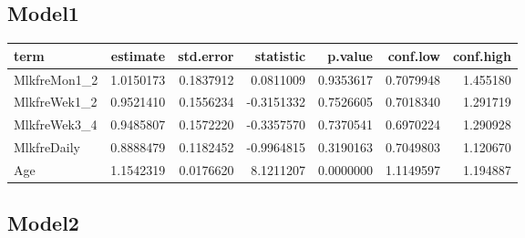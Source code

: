 \documentclass[
]{article}
\newenvironment{Shaded}{\begin{snugshade}}{\end{snugshade}}
\newcommand{\DataTypeTok}[1]{\textcolor[rgb]{0.13,0.29,0.53}{#1}}
\newcommand{\KeywordTok}[1]{\textcolor[rgb]{0.13,0.29,0.53}{\textbf{#1}}}
\newcommand{\NormalTok}[1]{#1}
\newcommand{\OperatorTok}[1]{\textcolor[rgb]{0.81,0.36,0.00}{\textbf{#1}}}
\newcommand{\OtherTok}[1]{\textcolor[rgb]{0.56,0.35,0.01}{#1}}
\newcommand{\StringTok}[1]{\textcolor[rgb]{0.31,0.60,0.02}{#1}}
\begin{document}
\hypertarget{model1-9}{%
\subsection{Model1}\label{model1-9}}

\begin{Shaded}
\end{Shaded}

\begin{longtable}[]{@{}lrrrrrr@{}}
\toprule
term & estimate & std.error & statistic & p.value & conf.low &
conf.high\tabularnewline
\midrule
\endhead
MlkfreMon1\_2 & 1.0150173 & 0.1837912 & 0.0811009 & 0.9353617 &
0.7079948 & 1.455180\tabularnewline
MlkfreWek1\_2 & 0.9521410 & 0.1556234 & -0.3151332 & 0.7526605 &
0.7018340 & 1.291719\tabularnewline
MlkfreWek3\_4 & 0.9485807 & 0.1572220 & -0.3357570 & 0.7370541 &
0.6970224 & 1.290928\tabularnewline
MlkfreDaily & 0.8888479 & 0.1182452 & -0.9964815 & 0.3190163 & 0.7049803
& 1.120670\tabularnewline
Age & 1.1542319 & 0.0176620 & 8.1211207 & 0.0000000 & 1.1149597 &
1.194887\tabularnewline
\bottomrule
\end{longtable}

\hypertarget{model2-9}{%
\subsection{Model2}\label{model2-9}}
\end{document}
